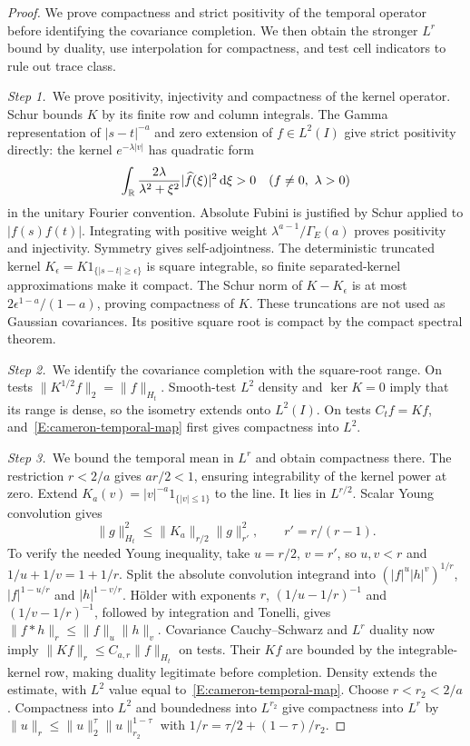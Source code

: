\begin{proof}
  We prove compactness and strict positivity of the temporal operator before
  identifying the covariance completion. We then obtain the stronger $L^r$
  bound by duality, use interpolation for compactness, and test cell
  indicators to rule out trace class.


  \medskip
  \noindent\textit{Step 1.~}We prove positivity, injectivity and compactness
  of the kernel operator.
  Schur bounds $K$ by its finite row and column integrals. The Gamma
  representation of $|s-t|^{-a}$ and zero extension of $f \in L^2(I)$ give
  strict positivity directly: the kernel $e^{-\lambda|v|}$ has quadratic form
  \[
    \int_{\mathbb{R}}\frac{2\lambda}{\lambda^2+\xi^2}
    |\widehat{f}(\xi)|^2\,\mathrm{d}\xi>0
    \quad(f\ne0,\ \lambda>0)
  \]
  in the unitary Fourier convention. Absolute Fubini is justified by Schur
  applied to $|f(s)f(t)|$. Integrating with positive weight
  $\lambda^{a-1}/\Gamma_E(a)$ proves positivity and injectivity. Symmetry gives
  self-adjointness. The deterministic truncated kernel $K_\epsilon =
  K1_{\{|s-t|\ge\epsilon\}}$ is square integrable, so finite separated-kernel
  approximations make it compact. The Schur norm of $K-K_\epsilon$ is at most
  $2\epsilon^{1-a}/(1-a)$, proving compactness of $K$. These truncations are not
  used as Gaussian covariances. Its positive square root is compact by the
  compact spectral theorem.


  \medskip
  \noindent\textit{Step 2.~}We identify the covariance completion with the
  square-root range.
  On tests $\|K^{1/2}f\|_2 = \|f\|_{H_t}$. Smooth-test $L^2$ density and $\ker K
  = 0$ imply that its range is dense, so the isometry extends onto $L^2(I)$. On
  tests $C_tf = Kf$, and~\eqref{E:cameron-temporal-map} first gives compactness
  into $L^2$.


  \medskip
  \noindent\textit{Step 3.~}We bound the temporal mean in $L^r$ and obtain
  compactness there.
  The restriction $r<2/a$ gives $ar/2<1$, ensuring integrability of the kernel
  power at zero.
  Extend $K_a(v) = |v|^{-a}1_{\{|v|\le1\}}$ to the line. It lies in $L^{r/2}$.
  Scalar Young convolution gives
  \[
    \|g\|_{H_t}^2\le\|K_a\|_{r/2}\|g\|_{r'}^2,\qquad
    r'=r/(r-1).
  \]
  To verify the needed Young inequality, take $u = r/2$, $v = r'$, so $u,v < r$
  and $1/u+1/v = 1+1/r$. Split the absolute convolution integrand into
  $(|f|^u|h|^v)^{1/r}$, $|f|^{1-u/r}$ and $|h|^{1-v/r}$. H\"older with exponents
  $r$, $(1/u-1/r)^{-1}$ and $(1/v-1/r)^{-1}$, followed by integration and
  Tonelli, gives $\|f*h\|_r \le \|f\|_u\|h\|_v$. Covariance Cauchy--Schwarz and
  $L^r$ duality now imply $\|Kf\|_r \le C_{a,r}\|f\|_{H_t}$ on tests. Their $Kf$
  are bounded by the integrable-kernel row, making duality legitimate before
  completion. Density extends the estimate, with $L^2$ value equal
  to~\eqref{E:cameron-temporal-map}. Choose $r < r_2 < 2/a$. Compactness into
  $L^2$ and boundedness into $L^{r_2}$ give compactness into $L^r$ by $\|u\|_r
  \le \|u\|_2^\tau\|u\|_{r_2}^{1-\tau}$ with $1/r = \tau/2+(1-\tau)/r_2$.



\end{proof}
